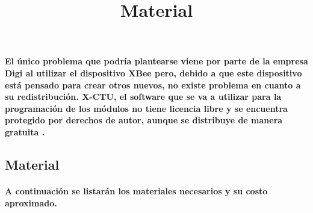\paragraph{
El único problema que podría plantearse viene por parte de la empresa Digi al utilizar
el dispositivo XBee pero, debido a que este dispositivo está pensado para crear otros
nuevos, no existe problema en cuanto a su redistribución. X-CTU, el software que se va a
utilizar para la programación de los módulos no tiene licencia libre y se encuentra protegido
por derechos de autor, aunque se distribuye de manera gratuita \cite{licenciaXCTU}.
}

\subsection{Material}
\title{Material}

\paragraph{A continuación se listarán los materiales necesarios y su costo aproximado.}

